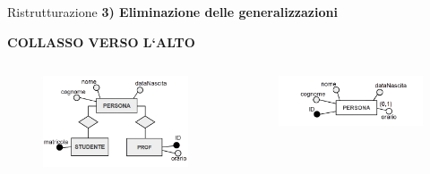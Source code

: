 %
\begin{frame}{Ristrutturazione}
\textbf{3) Eliminazione delle generalizzazioni}
\\\vspace{2em}
\begin{center}
    \textbf{COLLASSO VERSO L`ALTO}
\end{center}
\begin{columns}
        \begin{column}{0.5\textwidth}
            \begin{figure}[h]
        \centering
        \includegraphics[width=1\textwidth]{img/i6.png}
    \end{figure}
        \end{column}
        \begin{column}{0.5\textwidth}
            \begin{figure}[h]
        \centering
        \includegraphics[width=1\textwidth]{img/i8.png}
    \end{figure}
        \end{column}
    \end{columns}
\end{frame}
%
